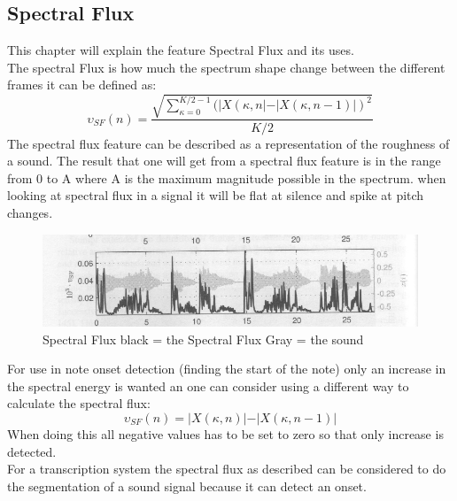 \subsection{Spectral Flux}
This chapter will explain the feature Spectral Flux and its uses.\\
The spectral Flux is how much the spectrum shape change between the different frames it can be defined as\citep{ACA}:
\begin{equation}\label{Spectral Flux eq}
	\upsilon_{SF}(n) = \frac{\sqrt{\displaystyle\sum_{\kappa=0}^{K/2-1}(\vert X(\kappa,n\vert-\vert X(\kappa,n-1)\vert)^2}}{K/2}
\end{equation} 
The spectral flux feature can be described as a representation of the roughness of a sound. The result that one will get from a spectral flux feature is in the range from 0 to A where A is the maximum magnitude possible in the spectrum\citep{ACA}. when looking at spectral flux in a signal it will be flat at silence and spike at pitch changes\citep{ACA}.
\begin{figure}[h]
	\begin{center}
		\includegraphics[scale = 0.5]{fig/spectral_flux.jpg}
		\caption{Spectral Flux black = the Spectral Flux Gray = the sound \citep{ACA}}
		\label{Spectral flux pic}
	\end{center}
\end{figure}
For use in note onset detection (finding the start of the note) only an increase in the spectral energy is wanted an one can consider using a different way to calculate the spectral flux\citep{ACA}:
\begin{equation}
	\upsilon_{SF}(n) = \vert X(\kappa,n)\vert-\vert X(\kappa,n-1)\vert
\end{equation}
When doing this all negative values has to be set to zero so that only increase is detected\citep{ACA}.
\\
For a transcription system the spectral flux as described can be considered to do the segmentation of a sound signal because it can detect an onset. 
 
